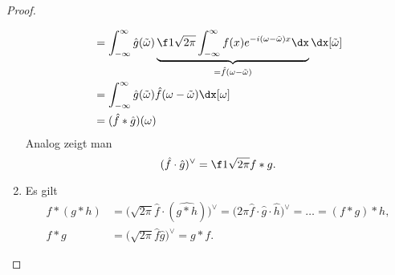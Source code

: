 \begin{st}
\begin{proof}
\begin{enumerate}[1)]
\begin{align*}
					&= \int_{-\infty}^\infty \hat g(\tilde \omega) \underbrace{\f 1{\sqrt{2\pi}} \int_{-\infty}^{\infty} f(x) e^{-i(\omega - \tilde \omega)x} \dx}_{=\hat f(\omega - \tilde \omega)} \dx[\tilde \omega] \\
					&= \int_{-\infty}^\infty \hat g(\tilde \omega)\hat f(\omega - \tilde \omega) \dx[\omega] \\
					&= (\hat f \ast \hat g)(\omega)
				\end{align*}
				Analog zeigt man
				\[
					(\hat f \cdot \hat g)^\vee = \f 1{\sqrt{2\pi}} f \ast g.
				\]
			\item
				Es gilt
				\begin{align*}
					f \ast (g \ast h)
						&= \Big(\sqrt{2\pi} \hat f \cdot (\widehat{g \ast h})\Big)^\vee
						= \Big(2\pi \hat f \cdot \hat g \cdot \hat h \Big)^\vee
						= \dotso
						= (f \ast g) \ast h, \\
					f \ast g
						&= \Big(\sqrt{2\pi} \hat f \hat g\Big)^\vee
						= g \ast f.
				\end{align*}
		\end{enumerate}
	\end{proof}
\end{st}

